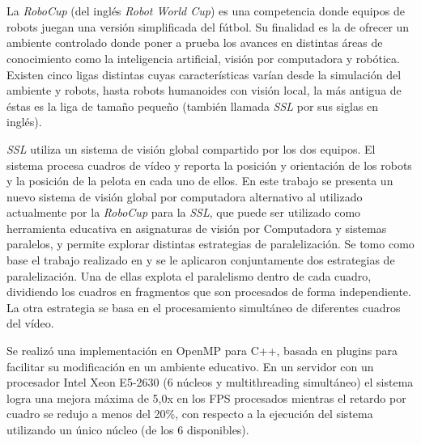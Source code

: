 \ \\
\ \\
\label{pagresum}
\\
\ \\
\ \\

\ \\

\ \\

La \emph{RoboCup} (del inglés \emph{Robot World Cup}) es una competencia donde
equipos de robots juegan una versión simplificada del fútbol. Su finalidad es
la de ofrecer un ambiente controlado donde poner a prueba los avances en
distintas áreas de conocimiento como la inteligencia artificial, visión por
computadora y robótica. Existen cinco ligas distintas cuyas características
varían desde la simulación del ambiente y robots, hasta robots humanoides con
visión local, la más antigua de éstas es la liga de tamaño pequeño (también
llamada \emph{SSL} por sus siglas en inglés).

\emph{SSL} utiliza un sistema de visión global compartido por los dos equipos.
El sistema procesa cuadros de vídeo y reporta la posición y orientación de los
robots y la posición de la pelota en cada uno de ellos. En este trabajo se
presenta un nuevo sistema de visión global por computadora alternativo al
utilizado actualmente por la \emph{RoboCup} para la \emph{SSL}, que puede ser
utilizado como herramienta educativa en asignaturas de visión por Computadora y
sistemas paralelos, y permite explorar distintas estrategias de paralelización.
Se tomo como base el trabajo realizado en \cite{torres2014} y se le aplicaron
conjuntamente dos estrategias de paralelización. Una de ellas explota el
paralelismo dentro de cada cuadro, dividiendo los cuadros en fragmentos que son
procesados de forma independiente. La otra estrategia se basa en el
procesamiento simultáneo de diferentes cuadros del vídeo.

Se realizó una implementación en OpenMP para C++, basada en plugins para
facilitar su modificación en un ambiente educativo. En un servidor con un
procesador Intel Xeon E5-2630 (6 núcleos y multithreading simultáneo) el
sistema logra una mejora máxima de 5,0x en los FPS procesados mientras el
retardo por cuadro se redujo a menos del 20\%, con respecto a la ejecución del
sistema utilizando un único núcleo (de los 6 disponibles).

\vfill
\pagebreak

